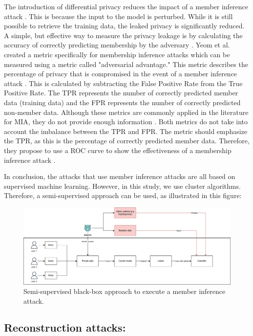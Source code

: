 The introduction of differential privacy reduces the impact of a member inference attack \citep{rigaki_survey_2021,hu_membership_2022}.
This is because the input to the model is perturbed. While it is still possible to retrieve the training data, the leaked privacy is significantly reduced.
A simple, but effective way to measure the privacy leakage is by calculating the accuracy of correctly predicting membership by the adversary \citep{choquette-choo_label-only_2021}.
Yeom et al. created a metric specifically for membership inference attacks which can be measured using a metric called "adversarial advantage."
This metric describes the percentage of privacy that is compromised in the event of a member inference attack \citep{yeom_privacy_2018}.
This is calculated by subtracting the False Positive Rate from the True Positive Rate.
The TPR represents the number of correctly predicted member data (training data) and the FPR represents the number of correctly predicted non-member data.
Although these metrics are commonly applied in the literature for MIA, they do not provide enough information \citep{carlini_membership_2022}.
Both metrics do not take into account the imbalance between the TPR and FPR.
The metric should emphasize the TPR, as this is the percentage of correctly predicted member data.
Therefore, they propose to use a ROC curve to show the effectiveness of a membership inference attack \citep{carlini_membership_2022}. \newline

In conclusion, the attacks that use member inference attacks are all based on supervised machine learning.
However, in this study, we use cluster algorithms.
Therefore, a semi-supervised approach can be used, as illustrated in this figure:

\begin{figure}[h]
  \label{figure:MIA-semi-supervised}
  \includegraphics[width=1\textwidth]{TheorethicalFramework/Differential privacy/master-thesis-MIA.png}
  \caption{Semi-supervised black-box approach to execute a member inference attack.}
\end{figure}

\subsection{Reconstruction attacks:}

